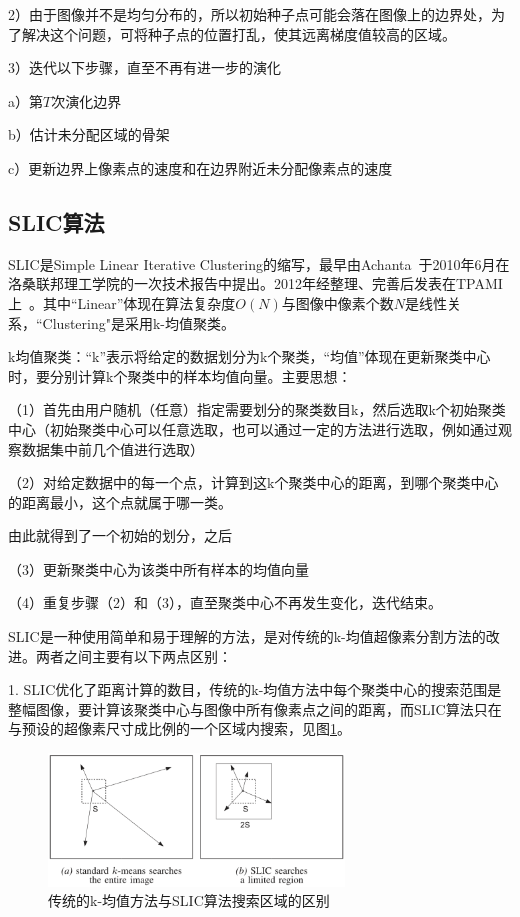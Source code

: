\documentclass[12pt]{article}
\begin{document}
2）由于图像并不是均匀分布的，所以初始种子点可能会落在图像上的边界处，为了解决这个问题，可将种子点的位置打乱，使其远离梯度值较高的区域。

3）迭代以下步骤，直至不再有进一步的演化
 
a）第$T$次演化边界

b）估计未分配区域的骨架

c）更新边界上像素点的速度和在边界附近未分配像素点的速度

\subsection{SLIC算法}

SLIC是Simple Linear Iterative Clustering的缩写，最早由Achanta~\cite{achanta2010slic}于2010年6月在洛桑联邦理工学院的一次技术报告中提出。2012年经整理、完善后发表在TPAMI上~\cite{achanta2012slic}。其中“Linear”体现在算法复杂度$O(N)$与图像中像素个数$N$是线性关系，“Clustering"是采用k-均值聚类。

k均值聚类：“k”表示将给定的数据划分为k个聚类，“均值”体现在更新聚类中心时，要分别计算k个聚类中的样本均值向量。主要思想：

（1）首先由用户随机（任意）指定需要划分的聚类数目k，然后选取k个初始聚类中心（初始聚类中心可以任意选取，也可以通过一定的方法进行选取，例如通过观察数据集中前几个值进行选取）

（2）对给定数据中的每一个点，计算到这k个聚类中心的距离，到哪个聚类中心的距离最小，这个点就属于哪一类。

由此就得到了一个初始的划分，之后

（3）更新聚类中心为该类中所有样本的均值向量

（4）重复步骤（2）和（3），直至聚类中心不再发生变化，迭代结束。

SLIC是一种使用简单和易于理解的方法，是对传统的k-均值超像素分割方法的改进。两者之间主要有以下两点区别：

1. SLIC优化了距离计算的数目，传统的k-均值方法中每个聚类中心的搜索范围是整幅图像，要计算该聚类中心与图像中所有像素点之间的距离，而SLIC算法只在与预设的超像素尺寸成比例的一个区域内搜索，见图\ref{fig: searchregion}。

\begin{figure}[!ht]
\centering
\includegraphics[width=0.7\textwidth]{searchregion.png}
\caption{传统的k-均值方法与SLIC算法搜索区域的区别}
\label{fig: searchregion}
\end{figure} 
\end{document}

